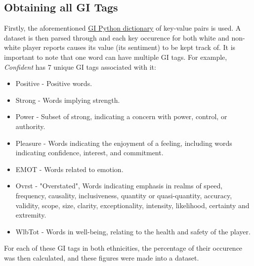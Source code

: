 \documentclass[oneside,12pt]{Classes/RoboticsLaTeX}
\begin{document}
\paragraph{}

\subsection{Obtaining all GI Tags}
Firstly, the aforementioned \hyperref[sec:GI_dict]{GI Python dictionary} of key-value pairs is used. A dataset is then parsed through and each key occurence for both white and non-white player reports
causes its value (its sentiment) to be kept track of. It is important to note that one word can have multiple GI tags. For example, {\it Confident} has 7 unique GI tags associated with it:
\begin{itemize}
  \item Positive - Positive words.
  \item Strong - Words implying strength.
  \item Power - Subset of strong, indicating a concern with power, control, or authority.
  \item Pleasure - Words indicating the enjoyment of a feeling, including words indicating confidence, interest, and commitment.
  \item EMOT - Words related to emotion.
  \item Ovrst - "Overstated", Words indicating emphasis in realms of speed, frequency, causality, inclusiveness, quantity or 
                  quasi-quantity, accuracy, validity, scope, size, clarity, exceptionality, intensity, likelihood, certainty and extremity.
  \item WlbTot - Words in well-being, relating to the health and safety of the player.
\end{itemize}
For each of these GI tags in both ethnicities, the percentage of their occurence was then calculated, and these figures were made into a dataset.
\end{document}
